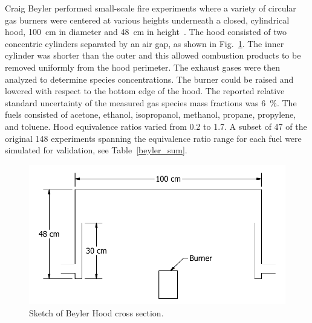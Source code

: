Craig Beyler performed small-scale fire experiments where a variety of circular gas burners were centered at various heights underneath a closed, cylindrical hood, 100~cm in diameter and 48~cm in height~\cite{Beyler:Hood}.  The hood consisted of two concentric cylinders separated by an air gap, as shown in Fig.~\ref{Beyler_Hood_Sketch}.  The inner cylinder was shorter than the outer and this allowed combustion products to be removed uniformly from the hood perimeter.  The exhaust gases were then analyzed to determine species concentrations. The burner could be raised and lowered with respect to the bottom edge of the hood. The reported relative standard uncertainty of the measured gas species mass fractions was 6~\%. The fuels consisted of acetone, ethanol, isopropanol, methanol, propane, propylene, and toluene. Hood equivalence ratios varied from 0.2 to 1.7.  A subset of 47 of the original 148 experiments spanning the equivalence ratio range for each fuel were simulated for validation, see Table~\ref{beyler_sum}.

\begin{figure}[h]
\centering
\includegraphics[width=\textwidth]{FIGURES/Beyler_Hood/Beyler_Hood}
\caption[Sketch of Beyler Hood cross section]{Sketch of Beyler Hood cross section.}
\label{Beyler_Hood_Sketch}
\end{figure}

